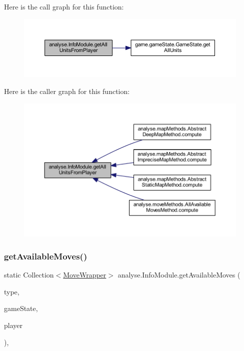 Here is the call graph for this function\+:
\nopagebreak
\begin{figure}[H]
\begin{center}
\leavevmode
\includegraphics[width=350pt]{classanalyse_1_1_info_module_a502795470587e7a7b93af1f1fd7a470d_cgraph}
\end{center}
\end{figure}
Here is the caller graph for this function\+:
\nopagebreak
\begin{figure}[H]
\begin{center}
\leavevmode
\includegraphics[width=350pt]{classanalyse_1_1_info_module_a502795470587e7a7b93af1f1fd7a470d_icgraph}
\end{center}
\end{figure}
\mbox{\label{classanalyse_1_1_info_module_a6dfaaeb16de4ae73d9d0a72acc8817a0}} 
\subsubsection{\texorpdfstring{get\+Available\+Moves()}{getAvailableMoves()}}
{\footnotesize\ttfamily static Collection$<$\mbox{\hyperlink{classanalyse_1_1_move_wrapper}{Move\+Wrapper}}$>$ analyse.\+Info\+Module.\+get\+Available\+Moves (\begin{DoxyParamCaption}\item[{\mbox{\hyperlink{enumanalyse_1_1_e_metrics_move_type}{E\+Metrics\+Move\+Type}}}]{type,  }\item[{\mbox{\hyperlink{classgame_1_1game_state_1_1_game_state}{Game\+State}}}]{game\+State,  }\item[{\mbox{\hyperlink{enumgame_1_1_e_player}{E\+Player}}}]{player }\end{DoxyParamCaption})\hspace{0.3cm}{\ttfamily [inline]}, {\ttfamily [static]}}

